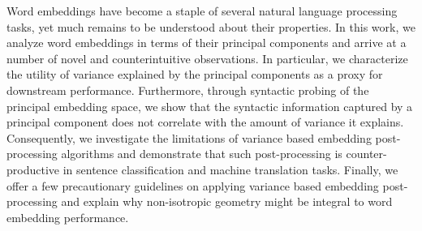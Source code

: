 Word embeddings have become a staple of several natural language processing tasks, yet much remains to be understood about their properties. In this work, we analyze word embeddings in terms of their principal components and arrive at a number of novel and counterintuitive observations. In particular, we characterize the utility of variance explained by the principal components as a proxy for downstream performance. Furthermore, through syntactic probing of the principal embedding space, we show that the syntactic information captured by a principal component does not correlate with the amount of variance it explains. Consequently, we investigate the limitations of variance based embedding post-processing algorithms and demonstrate that such post-processing is counter-productive in sentence classification and machine translation tasks. Finally, we offer a few precautionary guidelines on applying variance based embedding post-processing and explain why non-isotropic geometry might be integral to word embedding performance.
